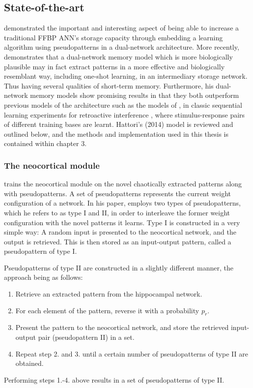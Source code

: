 \subsection{State-of-the-art}

\cite{Ans1997} demonstrated the important and interesting aspect of being able to increase a traditional FFBP ANN's storage capacity through embedding a learning algorithm using pseudopatterns in a dual-network architecture. More recently, \cite{Hattori2010, Hattori2014} demonstrates that a dual-network memory model which is more biologically plausible may in fact extract patterns in a more effective and biologically resemblant way, including one-shot learning, in an intermediary storage network. Thus having several qualities of short-term memory. Furthermore, his dual-network memory models show promising results in that they both outperform previous models of the architecture such as the models of \citep{French1997, Ans1997}, in classic sequential learning experiments for retroactive interference \citep{McCloskey1989}, where stimulus-response pairs of different training bases are learnt.
Hattori's (2014) model is reviewed and outlined below, and the methods and implementation used in this thesis is contained within chapter 3.

\subsubsection{The neocortical module}

\cite{Hattori2010} trains the neocortical module on the novel chaotically extracted patterns along with pseudopatterns. A set of pseudopatterns represents the current weight configuration of a network. In his paper, \cite{Hattori2010} employs two types of pseudopatterns, which he refers to as type I and II, in order to interleave the former weight configuration with the novel patterns it learns. Type I is constructed in a very simple way: A random input is presented to the neocortical network, and the output is retrieved. This is then stored as an input-output pattern, called a pseudopattern of type I.

Pseudopatterns of type II are constructed in a slightly different manner, the approach being as follows:

\begin{enumerate}
\item Retrieve an extracted pattern from the hippocampal network.
\item For each element of the pattern, reverse it with a probability $p_r$.
\item Present the pattern to the neocortical network, and store the retrieved input-output pair (pseudopattern II) in a set.
\item Repeat step 2. and 3. until a certain number of pseudopatterns of type II are obtained.
\end{enumerate}
Performing steps 1.-4. above results in a set of pseudopatterns of type II.

